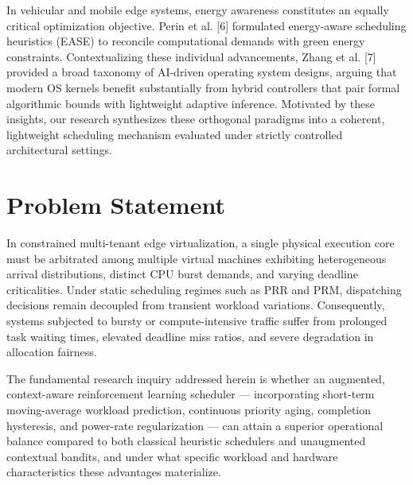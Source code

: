\documentclass[conference]{IEEEtran}
\begin{document}
In vehicular and mobile edge systems, energy awareness constitutes an equally critical optimization objective. Perin et al. [6] formulated energy-aware scheduling heuristics (EASE) to reconcile computational demands with green energy constraints. Contextualizing these individual advancements, Zhang et al. [7] provided a broad taxonomy of AI-driven operating system designs, arguing that modern OS kernels benefit substantially from hybrid controllers that pair formal algorithmic bounds with lightweight adaptive inference. Motivated by these insights, our research synthesizes these orthogonal paradigms into a coherent, lightweight scheduling mechanism evaluated under strictly controlled architectural settings.

\section{Problem Statement}
In constrained multi-tenant edge virtualization, a single physical execution core must be arbitrated among multiple virtual machines exhibiting heterogeneous arrival distributions, distinct CPU burst demands, and varying deadline criticalities. Under static scheduling regimes such as PRR and PRM, dispatching decisions remain decoupled from transient workload variations. Consequently, systems subjected to bursty or compute-intensive traffic suffer from prolonged task waiting times, elevated deadline miss ratios, and severe degradation in allocation fairness.

The fundamental research inquiry addressed herein is whether an augmented, context-aware reinforcement learning scheduler --- incorporating short-term moving-average workload prediction, continuous priority aging, completion hysteresis, and power-rate regularization --- can attain a superior operational balance compared to both classical heuristic schedulers and unaugmented contextual bandits, and under what specific workload and hardware characteristics these advantages materialize.
\end{document}
